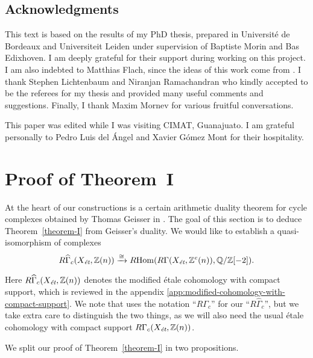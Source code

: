 \documentclass{article}
\DeclareMathOperator{\Hom}{Hom}
\newcommand{\QQ}{\mathbb{Q}}
\newcommand{\ZZ}{\mathbb{Z}}
\newcommand{\et}{\text{\it ét}}
\newcommand{\RHom}{R\!\Hom}
\theoremstyle{definition}
\numberwithin{equation}{section}
\begin{document}
\subsection*{Acknowledgments}

This text is based on the results of my PhD thesis, prepared in Université de
Bordeaux and Universiteit Leiden under supervision of Baptiste Morin and Bas
Edixhoven. I am deeply grateful for their support during working on this
project. I am also indebted to Matthias Flach, since the ideas of this work come
from \cite{Flach-Morin-2018}. I thank Stephen Lichtenbaum and Niranjan
Ramachandran who kindly accepted to be the referees for my thesis and provided
many useful comments and suggestions. Finally, I thank Maxim Mornev for various
fruitful conversations.

This paper was edited while I was visiting CIMAT, Guanajuato. I am grateful
personally to Pedro Luis del Ángel and Xavier Gómez Mont for their hospitality.


\section{Proof of Theorem~I}
\label{sec:arithmetic-duality-theorem}

At the heart of our constructions is a certain arithmetic duality theorem for
cycle complexes obtained by Thomas Geisser in \cite{Geisser-2010}. The goal of
this section is to deduce Theorem~\ref{theorem-I} from Geisser's duality.
We would like to establish a quasi-isomorphism of complexes
\[ R\widehat{\Gamma}_c (X_\et, \ZZ (n)) \xrightarrow{\cong}
\RHom (R\Gamma (X_\et, \ZZ^c (n)), \QQ/\ZZ [-2]). \]

Here $R\widehat{\Gamma}_c (X_\et, \ZZ (n))$ denotes the modified étale
cohomology with compact support, which is reviewed in the appendix
\ref{app:modified-cohomology-with-compact-support}. We note that
\cite{Geisser-2010} uses the notation ``$R\Gamma_c$'' for our
``$R\widehat{\Gamma}_c$'', but we take extra care to distinguish the two things,
as we will also need the usual étale cohomology with compact support
$R\Gamma_c (X_\et, \ZZ (n))$.

We split our proof of Theorem~\ref{theorem-I} in two propositions.
\end{document}
